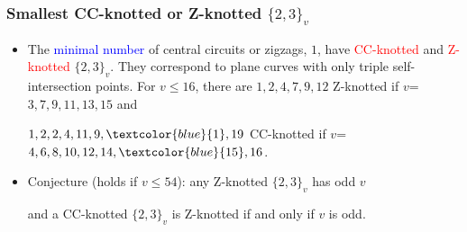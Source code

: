 \documentclass{beamer}
\begin{document}
\begin{frame}\frametitle{Smallest CC-knotted or Z-knotted
$\{2,3\}_v$}
\begin{itemize}
\item 
The \textcolor{blue}{minimal number} of central circuits or zigzags, $1$, have  
\textcolor{red}{CC-knotted} and \textcolor{red}{Z-knotted} 
$\{2,3\}_v$. They correspond to plane curves with   only triple
 self-intersection points.
For $v$$\le$$ 16$, 
there are 
$1,2,4,7,9,12$ Z-knotted if $v$=$3,7,9,11,13,15$ and

$1,2,2,4,11,9,\textcolor{blue}{1},19$ CC-knotted if 
$v$=$4,6,8,10,12, 
14,\textcolor{blue}{15},16$.

\item Conjecture (holds if $v$$\le$$54$): any Z-knotted  $\{2,3\}_v$ has 
odd 
$v$

and a CC-knotted  
$\{2,3\}_v$ is  Z-knotted if and only if $v$ is odd.
\end{itemize}


\end{frame}
\end{document}

